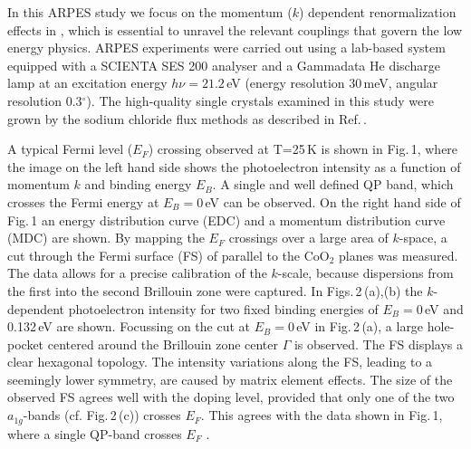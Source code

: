 \documentclass[preprint,showpacs,preprintnumbers,amsmath,amssymb,twoside,aps]{revtex4}
\begin{document}
In this ARPES study we focus on the momentum ($k$) dependent renormalization effects in \NCO , which is
essential to unravel the relevant couplings that govern the low energy physics. %
%
ARPES experiments were carried out using a lab-based system equipped with a SCIENTA SES 200 analyser and a Gammadata He discharge lamp at an
excitation energy $h \nu = 21.2$\,eV (energy resolution 30\,meV, angular resolution 0.3$^{\circ}$).
The high-quality \NCO\/ single crystals examined in this study were grown by the sodium chloride flux methods as described in Ref.\,\cite{Iljev04}.



A typical Fermi level ($E_F$) crossing observed at T=25\,K is shown in Fig.\,1, where the image on the left hand side shows the photoelectron
intensity as a function of momentum $k$ and binding energy $E_B$. A single and well defined QP band, which crosses the Fermi energy at $E_B=0$\,eV
can be observed. On the right hand side of Fig.\,1 an energy distribution curve (EDC) and a momentum distribution curve (MDC)
are shown. %
%
By mapping the $E_F$ crossings over a large area of $k$-space, a cut through the Fermi surface (FS) of \NCO\/ parallel to the CoO$_2$ planes was
measured. The data allows for a precise calibration of the $k$-scale, because dispersions from the first into the second Brillouin zone were
captured. In Figs.\,2\,(a),(b) the $k$-dependent photoelectron intensity for two fixed binding energies of $E_B=0$\,eV and 0.132\,eV are shown.
%
Focussing on the cut at $E_B=0$\,eV in Fig.\,2\,(a), a large hole-pocket centered around the Brillouin zone center $\Gamma$ is observed. The FS
displays a clear hexagonal topology. The intensity variations along the FS, leading to a seemingly lower symmetry, are caused by matrix element
effects.
%
The size of the observed FS agrees well with the doping level, provided that only one of the two $a_{1g}$-bands (cf. Fig.\,2\,(c)) crosses $E_F$.
This agrees with the data shown in Fig.\,1, where a single QP-band crosses $E_F$ .

%
\end{document}
